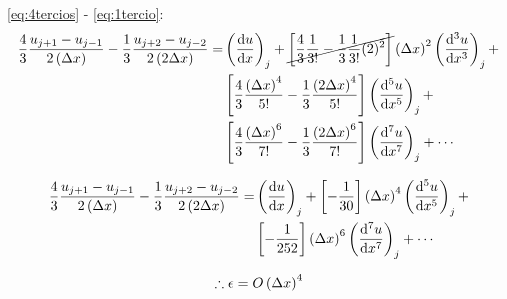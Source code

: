 \documentclass{article}
\begin{document}
\eqref{eq:4tercios} - \eqref{eq:1tercio}:
\begin{equation}
\def\u{\frac13}
\def\c{\frac43}
    \begin{split}
\c\frac{u_{j+1} - u_{j-1}}{2\Dx}-\u\frac{u_{j+2} -
u_{j-2}}{2\dDx} = & \derord{u}{x} + \cancel{ \left[
\c\frac{1}{3!} - \u\frac{1}{3!}(2)^2 \right] }
\Dx^2\derord[3]{u}{x} + \\
& \left[ \c\frac{\Dx^4}{5!} - \u\frac{\dDx^4}{5!}
\right]\derord[5]{u}{x} + \\
& \left[ \c\frac{\Dx^6}{7!} - \u\frac{\dDx^6}{7!}
\right]\derord[7]{u}{x} + \cdots
    \end{split}
\label{eq:o4}
\end{equation}

\begin{equation}
\def\u{\frac13}
\def\c{\frac43}
    \begin{split}
\c\frac{u_{j+1} - u_{j-1}}{2\Dx}-\u\frac{u_{j+2} -
u_{j-2}}{2\dDx} = & \derord{u}{x} + 
\left[ -\frac{1}{30} \right]\Dx^4\derord[5]{u}{x} + \\
& \left[ -\frac{1}{252} \right]\Dx^6\derord[7]{u}{x} + \cdots
    \end{split}
\label{eq:o4_s}
\end{equation}

\begin{equation}
	\therefore \epsilon = O\left( \Delta x \right)^4
\end{equation}
\end{document}
